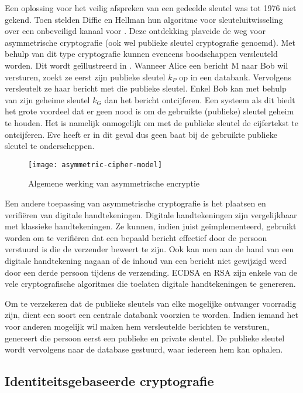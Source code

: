 Een oplossing voor het veilig afspreken van een gedeelde sleutel was tot 1976 niet gekend. Toen stelden Diffie en Hellman hun algoritme voor sleuteluitwisseling over een onbeveiligd kanaal voor \cite{diffie-hellman}. Deze ontdekking plaveide de weg voor asymmetrische cryptografie (ook wel publieke sleutel cryptografie genoemd). Met behulp van dit type cryptografie kunnen eveneens boodschappen versleuteld worden. Dit wordt ge\"illustreerd in . Wanneer Alice een bericht M naar Bob wil versturen, zoekt ze eerst zijn publieke sleutel $k_P$ op in een databank. Vervolgens versleutelt ze haar bericht met die publieke sleutel. Enkel Bob kan met behulp van zijn geheime sleutel $k_G$ dan het bericht ontcijferen. Een systeem als dit biedt het grote voordeel dat er geen nood is om de gebruikte (publieke) sleutel geheim te houden. Het is namelijk onmogelijk om met de publieke sleutel de cijfertekst te ontcijferen. Eve heeft er in dit geval dus geen baat bij de gebruikte publieke sleutel te onderscheppen. 

\begin{figure}[h]
	\centering
		 \texttt{[image: asymmetric-cipher-model]}
		 \caption{Algemene werking van asymmetrische encryptie\label{fig-encryptie-applicaties-asym-cipher}}
\end{figure}

Een andere toepassing van asymmetrische cryptografie is het plaatsen en verifi\"eren van digitale handtekeningen. Digitale handtekeningen zijn vergelijkbaar met klassieke handtekeningen. Ze kunnen, indien juist ge\-\"im\-ple\-men\-teerd, gebruikt worden om te verifi\"eren dat een bepaald bericht effectief door de persoon verstuurd is die de verzender beweert te zijn. Ook kan men aan de hand van een digitale handtekening nagaan of de inhoud van een bericht niet gewijzigd werd door een derde persoon tijdens de verzending. ECDSA \cite{ecdsa} en RSA \cite{rsa} zijn enkele van de vele cryptografische algoritmes die toelaten digitale handtekeningen te genereren.

Om te verzekeren dat de publieke sleutels van elke mogelijke ontvanger voorradig zijn, dient een soort een centrale databank voorzien te worden. Indien iemand het voor anderen mogelijk wil maken hem versleutelde berichten te versturen, genereert die persoon eerst een publieke en private sleutel. De publieke sleutel wordt vervolgens naar de database gestuurd, waar iedereen hem kan ophalen.

\subsection{Identiteitsgebaseerde cryptografie}

